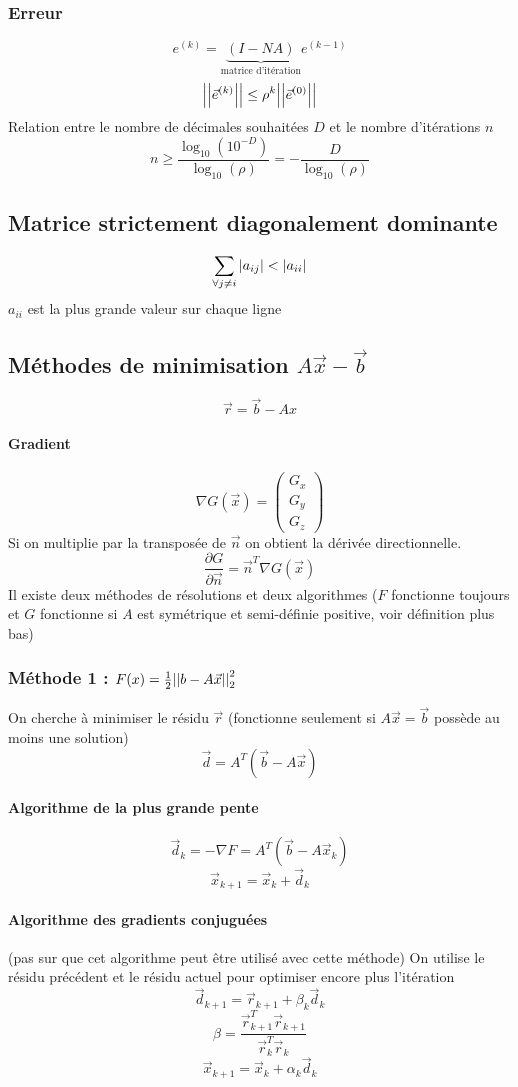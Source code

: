 \documentclass[resume]{subfiles}
\begin{document}
\subsubsection{Erreur}
$$e^{(k)}=\underbrace{(I-NA)}_\text{matrice d'itération}e^{(k-1)}$$
$$\abs{\abs{\vec{e}^{(k)}}}\leq \rho^{k}\abs{\abs{\vec{e}^{(0)}}}$$
Relation entre le nombre de décimales souhaitées $D$ et le nombre d'itérations $n$
$$n\geq \frac{\log_{10}(10^{-D})}{\log_{10}(\rho)}=-\frac{D}{\log_{10}(\rho)}$$
\subsection{Matrice strictement diagonalement dominante}
\label{strict_diag_dom}
$$\sum_{\forall j\neq i}\abs{a_{ij}}<\abs{a_{ii}}$$
$a_{ii}$ est la plus grande valeur sur chaque ligne
\subsection{Méthodes de minimisation $A\vec{x}-\vec{b}$}
$$\boxed{\vec{r}=\vec{b}-Ax}$$
\paragraph{Gradient}
$$\nabla G(\vec{x})=\begin{pmatrix}G_x\\G_y\\G_z\end{pmatrix}$$
Si on multiplie par la transposée de $\vec{n}$ on obtient la dérivée directionnelle.
$$\frac{\partial G}{\partial \vec{n}}=\vec{n}^{T}\nabla G(\vec{x})$$
Il existe deux méthodes de résolutions et deux algorithmes ($F$ fonctionne toujours et $G$ fonctionne si $A$ est symétrique et semi-définie positive, voir définition plus bas) 
\subsubsection{Méthode 1 : $F(x)=\frac{1}{2}\abs{\abs{b-A\vec{x}}}^2_2$}
On cherche à minimiser le résidu $\vec{r}$ (fonctionne seulement si $A\vec{x}=\vec{b}$ possède au moins une solution)
$$\vec{d}=A^T(\vec{b}-A\vec{x})$$
\paragraph{Algorithme de la plus grande pente}
$$\vec{d}_k=-\nabla F=A^T(\vec{b}-A\vec{x}_k)$$
$$\vec{x}_{k+1}=\vec{x}_k+\vec{d}_k$$
\paragraph{Algorithme des gradients conjuguées} (pas sur que cet algorithme peut être utilisé avec cette méthode)
On utilise le résidu précédent et le résidu actuel pour optimiser encore plus l'itération
$$\vec{d}_{k+1}=\vec{r}_{k+1}+\beta_k\vec{d}_k$$
$$\beta=\frac{\vec{r}_{k+1}^T\vec{r}_{k+1}}{\vec{r}_k^T\vec{r}_k}$$
$$\vec{x}_{k+1}=\vec{x}_{k}+\alpha_k\vec{d}_k$$
\end{document}

